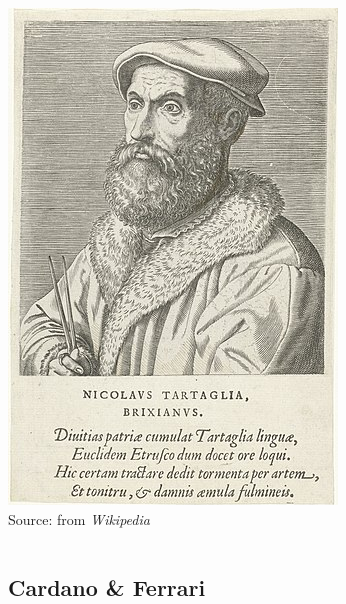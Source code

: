 \documentclass{beamer}
\begin{document}
\begin{frame}
\begin{columns}[c]
\includegraphics[width=\textwidth]{Tartaglia}\\[-1ex]
{\tiny Source: from \emph{Wikipedia}}
\end{columns}
\end{frame}


\subsection{Cardano \& Ferrari}
\end{document}
